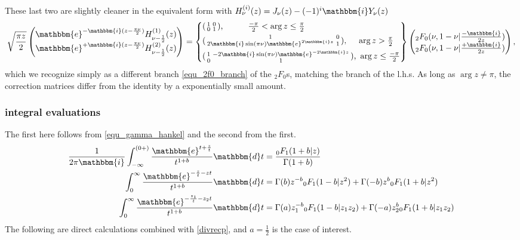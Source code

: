 \documentclass[12pt]{article}
\newcommand{\ee}[0] {\mathbbm{e}}
\newcommand{\ii}[0] {\mathbbm{i}}
\newcommand{\dd}[0] {\mathbbm{d}}
\numberwithin{equation}{section}
\begin{document}
These last two are slightly cleaner in the equivalent form with $H_{\nu}^{(i)}(z) = J_{\nu}(z) - (-1)^i \ii Y_{\nu}(z)$
\begin{equation*}
\sqrt{\frac{\pi z}{2}} \begin{pmatrix}
\ee^{-\ii (z - \frac{\pi \nu}{2})}H_{\nu-\frac{1}{2}}^{(1)}(z)\\
\ee^{+\ii (z - \frac{\pi \nu}{2})}H_{\nu-\frac{1}{2}}^{(2)}(z)
\end{pmatrix}
=
\left\{
\begin{aligned}
&(\begin{smallmatrix} 1&0\\ 0 &1\end{smallmatrix})\text{,} \quad \quad \quad \tfrac{-\pi}{2} < \arg z \le \tfrac{\pi}{2}\\
&(\begin{smallmatrix} 1& 0\\ 2\ii \sin(\pi \nu) \ee^{2 \ii z} &1\end{smallmatrix})\text{, } \quad \arg z> \tfrac{\pi}{2}\\
&(\begin{smallmatrix} 1&-2\ii \sin(\pi \nu) \ee^{-2 \ii z}\\ 0  &1\end{smallmatrix})\text{, } \arg z \le \tfrac{-\pi}{2}
\end{aligned}
\right\}
\begin{pmatrix}
{}_2 F_0(\nu,1-\nu|\tfrac{-\ii}{2 z})\\
{}_2 F_0(\nu,1-\nu|\tfrac{+\ii}{2 z})
\end{pmatrix}\text{,}
\end{equation*}
which we recognize simply as a different branch \eqref{equ_2f0_branch} of the ${}_2 F_0$s, matching the branch of the l.h.s. As long as $\arg z \ne \pi$, the correction matrices differ from the identity by a exponentially small amount.
\subsubsection{integral evaluations}
The first here follows from \eqref{equ_gamma_hankel} and the second from the first.
\begin{align*}
\frac{1}{2\pi \ii} \int_{-\infty}^{(0+)} \frac{\ee^{t + \frac{z}{t}}}{t^{1+b}} \dd t &= \frac{{}_0 F_{1} (1+b|z)}{\Gamma(1+b)}\\
\int_{0}^{\infty} \frac{\ee^{-\frac{z}{t} - z t}}{t^{1+b}} \dd t & = \Gamma(b) z^{-b} {}_0 F_{1} (1-b|z^2) + \Gamma(-b) z^{b} {}_0 F_{1} (1+b|z^2)\\
\int_{0}^{\infty} \frac{\ee^{-\frac{z_1}{t} - z_2 t}}{t^{1+b}} \dd t & = \Gamma(a) z_1^{-b} {}_0 F_{1} (1-b|z_1 z_2) + \Gamma(-a) z_2^{b} {}_0 F_{1} (1+b| z_1 z_2)
\end{align*}
The following are direct calculations combined with \eqref{divrecp}, and $a=\frac12$ is the case of interest.
\end{document}
